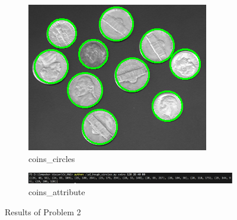 \documentclass[bwprint]{gmcmthesis}
\numberwithin{figure}{section}
\begin{document}
\begin{figure}[h]
\begin{subfigure}[b]{0.3\textwidth}
    \end{subfigure}
    \hfill
    \begin{subfigure}[b]{0.3\textwidth}
        \centering
        \includegraphics[width=\textwidth]{../output/coins_circles.png}
        \caption{coins\_circles}
        \label{fig:subfigure11}
    \end{subfigure}
    \newline
    \begin{subfigure}[b]{\textwidth}
        \centering
        \includegraphics[width=\textwidth]{../output/coins_attribute.png}
        \caption{coins\_attribute}
        \label{fig:subfigure12}
    \end{subfigure}
    \caption{Results of Problem 2}
\end{figure}
\end{document}

